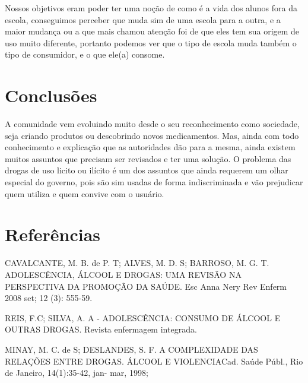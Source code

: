 \documentclass[article,12pt,onesidea,4paper,english,brazil]{abntex2}
\begin{document}
	Nossos objetivos eram poder ter uma noção de como é a vida dos alunos fora da escola, conseguimos perceber que muda sim de uma escola para a outra, e a maior mudança ou a que mais chamou atenção foi de que eles tem sua origem de uso muito diferente, portanto podemos ver que o tipo de escola muda também o tipo de consumidor, e o que ele(a) consome.
	
	\section*{Conclusões}
	
A comunidade vem evoluindo muito desde o seu reconhecimento como sociedade, seja criando produtos ou descobrindo novos medicamentos. Mas, ainda com todo conhecimento e explicação que as autoridades dão para a mesma, ainda existem muitos assuntos que precisam ser revisados e ter uma solução. O problema das drogas de uso licito ou ilícito é um dos assuntos que ainda requerem um olhar especial do governo, pois são sim usadas de forma indiscriminada e vão prejudicar quem utiliza e quem convive com o usuário.
	

	\section*{Referências}
	
	\noindent CAVALCANTE, M. B. de P. T; ALVES, M. D. S; BARROSO, M. G. T. ADOLESCÊNCIA, ÁLCOOL E DROGAS: UMA REVISÃO NA PERSPECTIVA DA PROMOÇÃO DA SAÚDE. Esc Anna Nery Rev Enferm 2008 set; 12 (3): 555-59.
	
	\noindent REIS, F.C; SILVA, A. A - ADOLESCÊNCIA: CONSUMO DE ÁLCOOL E
	OUTRAS DROGAS. Revista enfermagem integrada.
	
	\noindent MINAY, M. C. de S; DESLANDES, S. F. A COMPLEXIDADE DAS RELAÇÕES
	ENTRE DROGAS. ÁLCOOL E VIOLENCIACad. Saúde Públ., Rio de Janeiro, 14(1):35-42, jan- mar, 1998;
	
\end{document}
